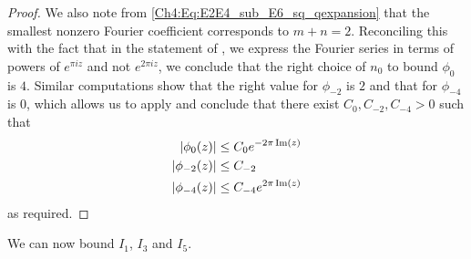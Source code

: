 \begin{proof}
    We also note from \eqref{Ch4:Eq:E2E4_sub_E6_sq_qexpansion} that the smallest nonzero Fourier coefficient corresponds to $m + n = 2$. Reconciling this with the fact that in the statement of , we express the Fourier series in terms of powers of $e^{\pi i z}$ and not $e^{2 \pi i z}$, we conclude that the right choice of $n_0$ to bound $\phi_0$ is $4$. Similar computations show that the right value for $\phi_{-2}$ is $2$ and that for $\phi_{-4}$ is $0$, which allows us to apply  and conclude that there exist $C_0, C_{-2}, C_{-4} > 0$ such that
    \begin{align*}
        \left\lvert \phi_0\!\left( z \right) \right\rvert &\leq C_{0} e^{-2\pi\operatorname{Im}(z)} \\
        \left\lvert \phi_{-2}\!\left( z \right) \right\rvert &\leq C_{-2} \\
        \left\lvert \phi_{-4}\!\left( z \right) \right\rvert &\leq C_{-4} e^{2\pi\operatorname{Im}(z)}
    \end{align*}
    as required.
\end{proof}

We can now bound $I_1$, $I_3$ and $I_5$.

